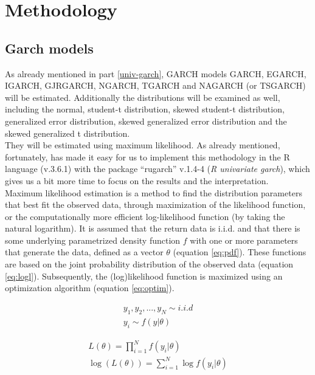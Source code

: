 \documentclass[a4paper, twoside]{templates/ociamthesis}
\begin{document}
\clearpage

\hypertarget{methodology}{%
\section{Methodology}\label{methodology}}

\hypertarget{garch-models}{%
\subsection{Garch models}\label{garch-models}}

As already mentioned in part \ref{univ-garch}, GARCH models GARCH, EGARCH, IGARCH, GJRGARCH, NGARCH, TGARCH and NAGARCH (or TSGARCH) will be estimated. Additionally the distributions will be examined as well, including the normal, student-t distribution, skewed student-t distribution, generalized error distribution, skewed generalized error distribution and the skewed generalized t distribution. ~\\

They will be estimated using maximum likelihood. As already mentioned, fortunately, \textcite{alexios2020} has made it easy for us to implement this methodology in the R language (v.3.6.1) with the package ``rugarch'' v.1.4-4 (\emph{R univariate garch}), which gives us a bit more time to focus on the results and the interpretation.~\\

Maximum likelihood estimation is a method to find the distribution parameters that best fit the observed data, through maximization of the likelihood function, or the computationally more efficient log-likelihood function (by taking the natural logarithm). It is assumed that the return data is i.i.d. and that there is some underlying parametrized density function \(f\) with one or more parameters that generate the data, defined as a vector \(\theta\) (equation \eqref{eq:pdf}). These functions are based on the joint probability distribution of the observed data (equation \eqref{eq:logl}). Subsequently, the (log)likelihood function is maximized using an optimization algorithm (equation \eqref{eq:optim}).

\begin{align} 
  y_1,y_2,...,y_N \sim i.i.d
    \\
  y_i \sim f(y|\theta)
 \label{eq:pdf}
\end{align}

\begin{align} 
 L(\theta) = \prod^N_{i=1}f(y_i|\theta)
  \\
 \log(L(\theta)) = \sum^N_{i=1} \log f(y_i |\theta)
 \label{eq:logl}
\end{align}
\end{document}
